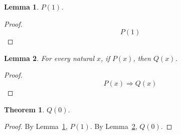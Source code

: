 \documentclass{article}
\newtheorem{lemma}{Lemma}
\newtheorem{theorem}{Theorem}
\begin{document}
\begin{lemma}\label{lem:available}
$P(1)$.
\end{lemma}
\begin{proof}
\[
P(1)
\]
\end{proof}

\begin{lemma}\label{lem:transfer}
For every natural $x$, if $P(x)$, then $Q(x)$.
\end{lemma}
\begin{proof}
\[
P(x) \Rightarrow Q(x)
\]
\end{proof}

\begin{theorem}\label{thm:main}
$Q(0)$.
\end{theorem}
\begin{proof}
By Lemma~\ref{lem:available}, $P(1)$.
By Lemma~\ref{lem:transfer}, $Q(0)$.
\end{proof}
\end{document}
